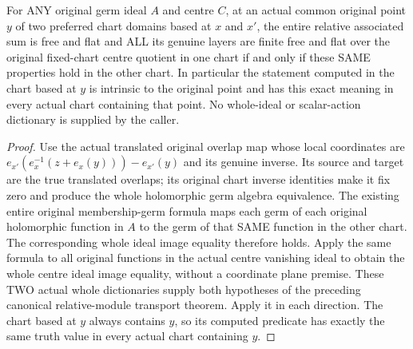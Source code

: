 \begin{theorem}
\label{hir:real-domain-original-relative-stalk-freeness-chart-independent}
\leanok
For ANY original germ ideal $A$ and centre $C$, at an actual common original
point $y$ of two preferred chart domains based at $x$ and $x'$, the entire
relative associated sum is free and flat and ALL its genuine layers are
finite free and flat over the original fixed-chart centre quotient in
one chart if and only if these SAME properties hold in the other chart.
In particular the statement computed in the chart based at $y$ is intrinsic
to the original point and has this exact meaning in every actual chart
containing that point. No whole-ideal or scalar-action dictionary is
supplied by the caller.
\end{theorem}
\begin{proof}
Use the actual translated original overlap map whose local coordinates
are $e_{x'}(e_x^{-1}(z+e_x(y)))-e_{x'}(y)$ and its genuine inverse. Its
source and target are the true translated overlaps; its original chart
inverse identities make it fix zero and produce the whole holomorphic
germ algebra equivalence. The existing entire original membership-germ
formula maps each germ of each original holomorphic function in $A$ to
the germ of that SAME function in the other chart. The corresponding
whole ideal image equality therefore holds. Apply the same formula to
all original functions in the actual centre vanishing ideal to obtain
the whole centre ideal image equality, without a coordinate plane premise.
These TWO actual whole dictionaries supply both hypotheses of the preceding
canonical relative-module transport theorem. Apply it in each direction.
The chart based at $y$ always contains $y$, so its computed predicate has
exactly the same truth value in every actual chart containing $y$.
\end{proof}

